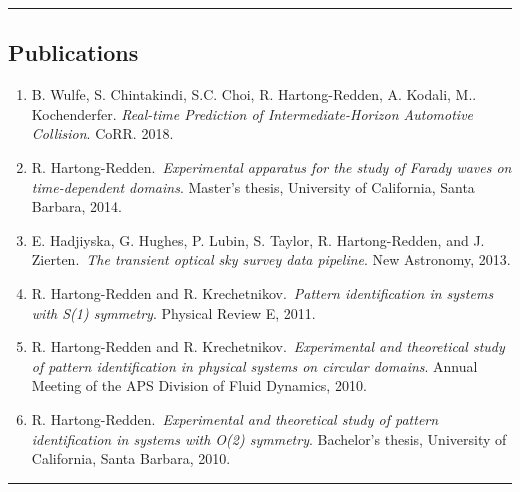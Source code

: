 \documentclass[10pt,letterpaper]{article}
\newenvironment{indentsection}[1]%
{\begin{list}{}%
	{\setlength{\leftmargin}{#1}}%
	\item[]%
}
{\end{list}}
\begin{document}
\hrule
\subsection*{Publications}
\begin{indentsection}{\parindent}
\begin{enumerate}
	\item B. Wulfe, S. Chintakindi, S.C. Choi, R. Hartong-Redden,  A. Kodali, M.. Kochenderfer. \emph{Real-time Prediction of Intermediate-Horizon Automotive Collision}. CoRR. 2018.
	\item R. Hartong-Redden.~\emph{Experimental apparatus for the study of Farady waves on time-dependent domains}. Master's thesis, University of California, Santa Barbara, 2014.
	\item E. Hadjiyska, G. Hughes, P. Lubin, S. Taylor, R. Hartong-Redden, and J. Zierten.~\emph{The transient optical sky survey data pipeline}. New Astronomy, 2013.
	\item R. Hartong-Redden and R. Krechetnikov.~{\em Pattern identification in systems with S(1) symmetry}. Physical Review E, 2011.
	\item R. Hartong-Redden and R. Krechetnikov.~{\em Experimental and theoretical study of pattern identification in physical systems on circular domains}. Annual Meeting of the APS Division of Fluid Dynamics, 2010.
	\item R. Hartong-Redden.~{\em Experimental and theoretical study of pattern identification in systems with O(2) symmetry}. Bachelor's thesis, University of California, Santa Barbara, 2010.
\end{enumerate}
\end{indentsection}
\hrule
\end{document}
